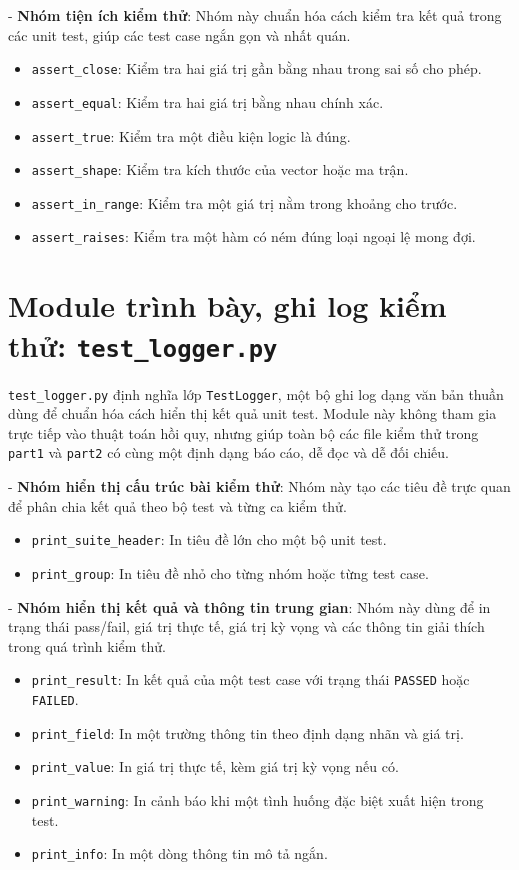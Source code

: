 \documentclass[12pt,a4paper]{report}
\begin{document}
- \textbf{Nhóm tiện ích kiểm thử}:
Nhóm này chuẩn hóa cách kiểm tra kết quả trong các unit test, giúp các test case ngắn gọn và nhất quán.
\begin{itemize}
    \item \texttt{assert\_close}: Kiểm tra hai giá trị gần bằng nhau trong sai số cho phép.
    \item \texttt{assert\_equal}: Kiểm tra hai giá trị bằng nhau chính xác.
    \item \texttt{assert\_true}: Kiểm tra một điều kiện logic là đúng.
    \item \texttt{assert\_shape}: Kiểm tra kích thước của vector hoặc ma trận.
    \item \texttt{assert\_in\_range}: Kiểm tra một giá trị nằm trong khoảng cho trước.
    \item \texttt{assert\_raises}: Kiểm tra một hàm có ném đúng loại ngoại lệ mong đợi.
\end{itemize}

\section{Module trình bày, ghi log kiểm thử: \texttt{test\_logger.py}}
\texttt{test\_logger.py} định nghĩa lớp \texttt{TestLogger}, một bộ ghi log dạng văn bản thuần dùng để chuẩn hóa cách hiển thị kết quả unit test. Module này không tham gia trực tiếp vào thuật toán hồi quy, nhưng giúp toàn bộ các file kiểm thử trong \texttt{part1} và \texttt{part2} có cùng một định dạng báo cáo, dễ đọc và dễ đối chiếu.

- \textbf{Nhóm hiển thị cấu trúc bài kiểm thử}:
Nhóm này tạo các tiêu đề trực quan để phân chia kết quả theo bộ test và từng ca kiểm thử.
\begin{itemize}
    \item \texttt{print\_suite\_header}: In tiêu đề lớn cho một bộ unit test.
    \item \texttt{print\_group}: In tiêu đề nhỏ cho từng nhóm hoặc từng test case.
\end{itemize}

- \textbf{Nhóm hiển thị kết quả và thông tin trung gian}:
Nhóm này dùng để in trạng thái pass/fail, giá trị thực tế, giá trị kỳ vọng và các thông tin giải thích trong quá trình kiểm thử.
\begin{itemize}
    \item \texttt{print\_result}: In kết quả của một test case với trạng thái \texttt{PASSED} hoặc \texttt{FAILED}.
    \item \texttt{print\_field}: In một trường thông tin theo định dạng nhãn và giá trị.
    \item \texttt{print\_value}: In giá trị thực tế, kèm giá trị kỳ vọng nếu có.
    \item \texttt{print\_warning}: In cảnh báo khi một tình huống đặc biệt xuất hiện trong test.
    \item \texttt{print\_info}: In một dòng thông tin mô tả ngắn.
\end{itemize}
\end{document}
